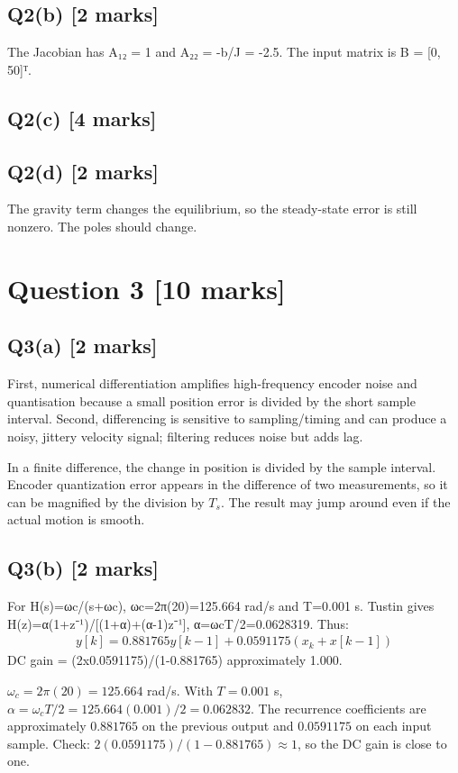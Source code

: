 \documentclass[11pt,a4paper]{article}
\begin{document}
\subsection*{Q2(b) \hfill [2 marks]}

The Jacobian has A₁₂ = 1 and A₂₂ = -b/J = -2.5.
The input matrix is B = [0, 50]ᵀ.

\subsection*{Q2(c) \hfill [4 marks]}

\vspace{2mm}

\subsection*{Q2(d) \hfill [2 marks]}

The gravity term changes the equilibrium, so the steady-state error is still nonzero.
The poles should change.

\section*{Question 3 \hfill [10 marks]}
\subsection*{Q3(a) \hfill [2 marks]}

First, numerical differentiation amplifies high-frequency encoder noise and quantisation because a small position error is divided by the short sample interval.
Second, differencing is sensitive to sampling/timing and can produce a noisy, jittery velocity signal; filtering reduces noise but adds lag.\par\smallskip In a finite difference, the change in position is divided by the sample interval. Encoder quantization error appears in the difference of two measurements, so it can be magnified by the division by $T_s$. The result may jump around even if the actual motion is smooth.

\subsection*{Q3(b) \hfill [2 marks]}

For H(s)=ωc/(s+ωc), ωc=2π(20)=125.664 rad/s and T=0.001 s.
Tustin gives H(z)=α(1+z⁻¹)/[(1+α)+(α-1)z⁻¹], α=ωcT/2=0.0628319.
Thus:\[\begin{aligned}y[k]=0.881765y[k-1]+0.0591175(x_k+x[k-1])\end{aligned}\]
DC gain = (2x0.0591175)/(1-0.881765) approximately 1.000.\par\smallskip $\omega_c=2\pi(20)=125.664$ rad/s. With $T=0.001$ s, $\alpha=\omega_cT/2=125.664(0.001)/2=0.062832$. The recurrence coefficients are approximately $0.881765$ on the previous output and $0.0591175$ on each input sample. Check: $2(0.0591175)/(1-0.881765)\approx1$, so the DC gain is close to one.
\end{document}

